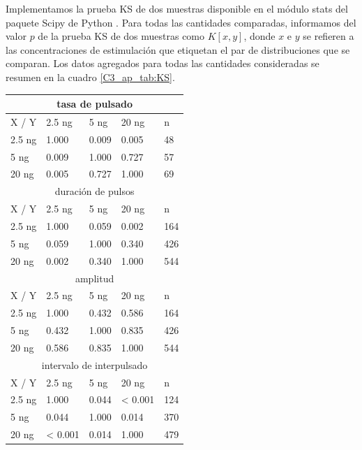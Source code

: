 \documentclass[./main.tex]{subfiles}
\begin{document}
\begin{subappendices}
Implementamos la prueba KS de dos muestras disponible en el módulo stats del paquete Scipy de Python \cite{Virtanen2020}. Para todas las cantidades comparadas, informamos del valor $p$ de la prueba KS de dos muestras como $K[x,y]$, donde $x$ e $y$ se refieren a las concentraciones de estimulación que etiquetan el par de distribuciones que se comparan. Los datos agregados para todas las cantidades consideradas se resumen en la cuadro \ref{C3_ap_tab:KS}.


\begin{table}[htbp]
\begin{adjustwidth}{-0.5in}{-0.5in}%
\centering
\begin{tabular}{|l||l|l|l|l|}
\hline \hline
\multicolumn{5}{|c|}{tasa de pulsado} \\ \hline
X / Y & 2.5 ng & 5 ng & 20 ng & n \\ \hline
2.5 ng & 1.000 & 0.009 & 0.005 & 48 \\
5 ng & 0.009 & 1.000 & 0.727 & 57 \\
20 ng & 0.005 & 0.727 & 1.000 & 69 \\ \hline \hline
\multicolumn{5}{|c|}{duración de pulsos} \\ \hline 
X / Y & 2.5 ng & 5 ng & 20 ng & n \\ \hline
2.5 ng & 1.000 & 0.059 & 0.002 & 164 \\
5 ng & 0.059 & 1.000 & 0.340 & 426 \\
20 ng & 0.002 & 0.340 & 1.000 & 544 \\ \hline \hline
\multicolumn{5}{|c|}{amplitud} \\ \hline 
X / Y & 2.5 ng & 5 ng & 20 ng & n \\ \hline
2.5 ng & 1.000 & 0.432 & 0.586 & 164 \\
5 ng & 0.432 & 1.000 & 0.835 & 426 \\
20 ng & 0.586 & 0.835 & 1.000 & 544 \\ \hline \hline
\multicolumn{5}{|c|}{intervalo de interpulsado} \\ \hline 
X / Y & 2.5 ng & 5 ng & 20 ng & n \\ \hline
2.5 ng & 1.000 & 0.044 & < 0.001 & 124 \\
5 ng & 0.044 & 1.000 & 0.014 & 370 \\
20 ng & < 0.001 & 0.014 & 1.000 & 479 \\ \hline \hline

\end{tabular}
\end{adjustwidth}
\end{table}
\end{subappendices}
\end{document}
